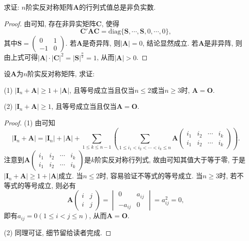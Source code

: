 \documentclass[../../main.tex]{subfiles}
\begin{document}
\begin{proposition}\label{proposition:实反称矩阵的行列式必非负}
求证: $n$阶实反对称矩阵$\boldsymbol{A}$的行列式值总是非负实数.
\end{proposition}
\begin{proof}
由可知, 存在非异实矩阵$\boldsymbol{C}$, 使得
\[
\boldsymbol{C}'\boldsymbol{A}\boldsymbol{C}=\text{diag}\{\boldsymbol{S}, \cdots, \boldsymbol{S}, 0, \cdots, 0\},
\]
其中$\boldsymbol{S}=\begin{pmatrix}
0 & 1 \\
-1 & 0
\end{pmatrix}$. 若$\boldsymbol{A}$是奇异阵, 则$|\boldsymbol{A}| = 0$, 结论显然成立. 若$\boldsymbol{A}$是非异阵, 则由上式可得$|\boldsymbol{A}|\cdot|\boldsymbol{C}|^2 = |\boldsymbol{S}|^{\frac{n}{2}} = 1$, 从而$|\boldsymbol{A}|>0$. 
\end{proof}

\begin{proposition}\label{proposition:反称矩阵A的I_n+A的行列式相关结论}
设$\boldsymbol{A}$为$n$阶实反对称矩阵, 求证:

(1) $|\boldsymbol{I}_n+\boldsymbol{A}|\geqslant  1 + |\boldsymbol{A}|$, 且等号成立当且仅当$n\leqslant  2$或当$n\geqslant  3$时, $\boldsymbol{A}=\boldsymbol{O}$.

(2) $|\boldsymbol{I}_n+\boldsymbol{A}|\geqslant  1$, 且等号成立当且仅当$\boldsymbol{A}=\boldsymbol{O}$.
\end{proposition}
\begin{proof}
(1) 由可知
\[
|\boldsymbol{I}_n+\boldsymbol{A}| = |\boldsymbol{I}_n|+|\boldsymbol{A}|+\sum_{1\leqslant  k\leqslant  n - 1}\left(\sum_{1\leqslant  i_1 < i_2 < \cdots < i_k\leqslant  n} \boldsymbol{A}\begin{pmatrix}
i_1 & i_2 & \cdots & i_k \\
i_1 & i_2 & \cdots & i_k
\end{pmatrix}\right).
\]
注意到$\boldsymbol{A}\begin{pmatrix}
i_1 & i_2 & \cdots & i_k \\
i_1 & i_2 & \cdots & i_k
\end{pmatrix}$是$k$阶实反对称行列式, 故由可知其值大于等于零, 于是$|\boldsymbol{I}_n+\boldsymbol{A}|\geqslant  1 + |\boldsymbol{A}|$成立. 当$n\leqslant  2$时, 容易验证不等式的等号成立. 当$n\geqslant  3$时, 若不等式的等号成立, 则必有
\[
\boldsymbol{A}\begin{pmatrix}
i & j \\
i & j
\end{pmatrix}=\begin{vmatrix}
0 & a_{ij} \\
-a_{ij} & 0
\end{vmatrix}=a_{ij}^2 = 0,
\]
即有$a_{ij} = 0 (1\leqslant  i < j\leqslant  n)$, 从而$\boldsymbol{A}=\boldsymbol{O}$.

(2) 同理可证, 细节留给读者完成. 
\end{proof}
\end{document}
